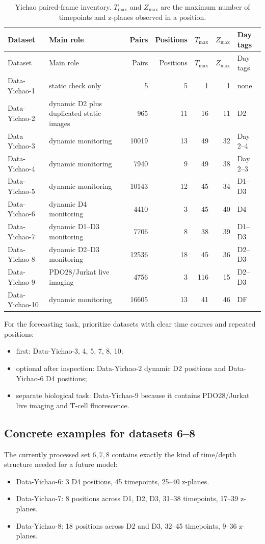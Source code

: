 \documentclass[11pt]{article}
\newcommand{\1}{\mathbf{1}}
\begin{document}
\begin{longtable}{@{}llrrrrl@{}}
\caption{Yichao paired-frame inventory. \(T_{\max}\) and \(Z_{\max}\) are the maximum number of timepoints and z-planes observed in a position.}\label{tab:data-inventory}\\
\toprule
Dataset & Main role & Pairs & Positions & \(T_{\max}\) & \(Z_{\max}\) & Day tags\\
\midrule
\endfirsthead
\toprule
Dataset & Main role & Pairs & Positions & \(T_{\max}\) & \(Z_{\max}\) & Day tags\\
\midrule
\endhead
Data-Yichao-1 & static check only & 5 & 5 & 1 & 1 & none\\
Data-Yichao-2 & dynamic D2 plus duplicated static images & 965 & 11 & 16 & 11 & D2\\
Data-Yichao-3 & dynamic monitoring & 10019 & 13 & 49 & 32 & Day 2--4\\
Data-Yichao-4 & dynamic monitoring & 7940 & 9 & 49 & 38 & Day 2--3\\
Data-Yichao-5 & dynamic monitoring & 10143 & 12 & 45 & 34 & D1--D3\\
Data-Yichao-6 & dynamic D4 monitoring & 4410 & 3 & 45 & 40 & D4\\
Data-Yichao-7 & dynamic D1--D3 monitoring & 7706 & 8 & 38 & 39 & D1--D3\\
Data-Yichao-8 & dynamic D2--D3 monitoring & 12536 & 18 & 45 & 36 & D2--D3\\
Data-Yichao-9 & PDO28/Jurkat live imaging & 4756 & 3 & 116 & 15 & D2--D3\\
Data-Yichao-10 & dynamic monitoring & 16605 & 13 & 41 & 46 & DF\\
\bottomrule
\end{longtable}

For the forecasting task, prioritize datasets with clear time courses and repeated positions:
\begin{itemize}[leftmargin=1.5em]
  \item first: Data-Yichao-3, 4, 5, 7, 8, 10;
  \item optional after inspection: Data-Yichao-2 dynamic D2 positions and Data-Yichao-6 D4 positions;
  \item separate biological task: Data-Yichao-9 because it contains PDO28/Jurkat live imaging and T-cell fluorescence.
\end{itemize}

\subsection{Concrete examples for datasets 6--8}
The currently processed set \(6,7,8\) contains exactly the kind of time/depth structure needed for a future model:
\begin{itemize}[leftmargin=1.5em]
  \item Data-Yichao-6: 3 D4 positions, 45 timepoints, 25--40 z-planes.
  \item Data-Yichao-7: 8 positions across D1, D2, D3, 31--38 timepoints, 17--39 z-planes.
  \item Data-Yichao-8: 18 positions across D2 and D3, 32--45 timepoints, 9--36 z-planes.
\end{itemize}
\end{document}
